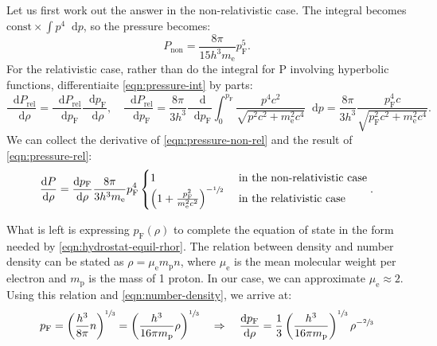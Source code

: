 \documentclass[]{article}
\newcommand{\dd}{\mathop{}\!\mathrm{d}}
\newcommand{\fermiMtm}{p_\mathrm{F}}
\newcommand{\massElectron}{m_\mathrm{e}}
\newcommand{\massProton}{m_\mathrm{p}}
\begin{document}
	Let us first work out the answer in the non-relativistic case. The integral becomes $\text{const} \times \int p^4 \dd p$, so the pressure becomes:
	\begin{equation}\label{eqn:pressure-non-rel}
		P_\mathrm{non} = \frac{8 \pi}{15 h^3 \massElectron} \fermiMtm^5.
	\end{equation}
	For the relativistic case, rather than do the integral for P involving hyperbolic functions, differentiaite \eqref{eqn:pressure-int} by parts:
	\begin{equation}\label{eqn:pressure-rel}
		\frac{\dd P_\mathrm{rel}}{\dd \rho} = \frac{\dd P_\mathrm{rel}}{\dd \fermiMtm} \frac{\dd \fermiMtm}{\dd \rho}, \quad \frac{\dd P_\mathrm{rel}}{\dd \fermiMtm} = \frac{8\pi}{3h^3}\frac{\dd}{\dd \fermiMtm}\int_0^{\fermiMtm} \frac{p^4 c^2}{\sqrt{p^2c^2 + \massElectron^2 c^4}} \dd p = \frac{8\pi}{3h^3} \frac{\fermiMtm^4 c}{\sqrt{\fermiMtm^2c^2 + \massElectron^2 c^4}}.
	\end{equation}
	We can collect the derivative of \eqref{eqn:pressure-non-rel} and the result of \eqref{eqn:pressure-rel}:
	\begin{equation}\label{eqn:pressure-both}
		\frac{\dd P}{\dd \rho} = \frac{\dd \fermiMtm}{\dd \rho}\frac{8 \pi}{3 h^3 \massElectron} \fermiMtm^4\begin{cases}
			1 & \text{ in the non-relativistic case} \\
			\left(1 + \frac{\fermiMtm^2}{\massElectron^2 c^2}\right)^{-\sfrac{1}{2}} & \text{ in the relativistic case}
		\end{cases}.
 	\end{equation}

	What is left is expressing $\fermiMtm (\rho)$ to complete the equation of state in the form needed by \eqref{eqn:hydrostat-equil-rhor}. The relation between density and number density can be stated as $\rho = \mu_\mathrm{e} \massProton n$, where $\mu_\mathrm{e}$ is the mean molecular weight per electron and $\massProton$ is the mass of 1 proton. In our case, we can approximate $\mu_\mathrm{e} \approx 2$. Using this relation and \eqref{eqn:number-density}, we arrive at:
	\begin{equation}\label{eqn:fermi-mtm}
		\fermiMtm = \left( \frac{h^3}{8 \pi} n \right)^{\sfrac{1}{3}} = \left( \frac{h^3}{16 \pi \massProton} \rho\right)^{\sfrac{1}{3}} \quad \Rightarrow \quad \frac{\dd \fermiMtm}{\dd \rho} = \frac{1}{3} \left( \frac{h^3}{16 \pi \massProton}\right)^{\sfrac{1}{3}} \rho^{-\sfrac{2}{3}}
	\end{equation}
\end{document}
